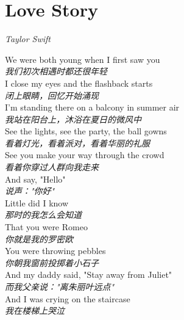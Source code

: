 \section{Love Story}

\begin{center}
\textit{Taylor Swift}
\end{center}

\vspace{1em}

\begin{spacing}{1.5}
\begin{flushleft}
We were both young when I first saw you\\
\textit{我们初次相遇时都还很年轻}\\[0.5em]

I close my eyes and the flashback starts\\
\textit{闭上眼睛，回忆开始涌现}\\[0.5em]

I'm standing there on a balcony in summer air\\
\textit{我站在阳台上，沐浴在夏日的微风中}\\[0.5em]

See the lights, see the party, the ball gowns\\
\textit{看着灯光，看着派对，看着华丽的礼服}\\[0.5em]

See you make your way through the crowd\\
\textit{看着你穿过人群向我走来}\\[0.5em]

And say, "Hello"\\
\textit{说声："你好"}\\[0.5em]

Little did I know\\
\textit{那时的我怎么会知道}\\[0.5em]

That you were Romeo\\
\textit{你就是我的罗密欧}\\[0.5em]

You were throwing pebbles\\
\textit{你朝我窗前投掷着小石子}\\[0.5em]

And my daddy said, "Stay away from Juliet"\\
\textit{而我父亲说："离朱丽叶远点"}\\[0.5em]

And I was crying on the staircase\\
\textit{我在楼梯上哭泣}\\[0.5em]


\end{flushleft}
\end{spacing}
